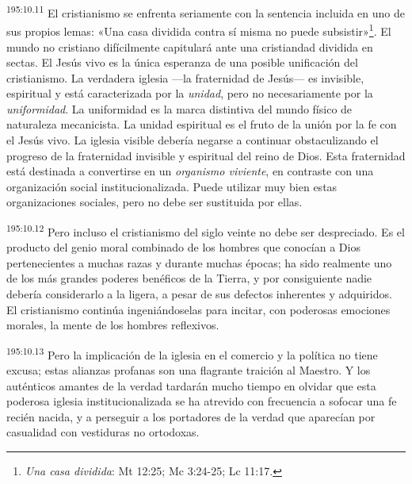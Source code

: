 \par
\textsuperscript{195:10.11} El cristianismo se enfrenta seriamente con la sentencia incluida en uno de sus propios lemas: «Una casa dividida contra sí misma no puede subsistir»\footnote{\textit{Una casa dividida}: Mt 12:25; Mc 3:24-25; Lc 11:17.}. El mundo no cristiano difícilmente capitulará ante una cristiandad dividida en sectas. El Jesús vivo es la única esperanza de una posible unificación del cristianismo. La verdadera iglesia ---la fraternidad de Jesús--- es invisible, espiritual y está caracterizada por la \textit{unidad}, pero no necesariamente por la \textit{uniformidad}. La uniformidad es la marca distintiva del mundo físico de naturaleza mecanicista. La unidad espiritual es el fruto de la unión por la fe con el Jesús vivo. La iglesia visible debería negarse a continuar obstaculizando el progreso de la fraternidad invisible y espiritual del reino de Dios. Esta fraternidad está destinada a convertirse en un \textit{organismo viviente}, en contraste con una organización social institucionalizada. Puede utilizar muy bien estas organizaciones sociales, pero no debe ser sustituida por ellas.

\par
\textsuperscript{195:10.12} Pero incluso el cristianismo del siglo veinte no debe ser despreciado. Es el producto del genio moral combinado de los hombres que conocían a Dios pertenecientes a muchas razas y durante muchas épocas; ha sido realmente uno de los más grandes poderes benéficos de la Tierra, y por consiguiente nadie debería considerarlo a la ligera, a pesar de sus defectos inherentes y adquiridos. El cristianismo continúa ingeniándoselas para incitar, con poderosas emociones morales, la mente de los hombres reflexivos.

\par
\textsuperscript{195:10.13} Pero la implicación de la iglesia en el comercio y la política no tiene excusa; estas alianzas profanas son una flagrante traición al Maestro. Y los auténticos amantes de la verdad tardarán mucho tiempo en olvidar que esta poderosa iglesia institucionalizada se ha atrevido con frecuencia a sofocar una fe recién nacida, y a perseguir a los portadores de la verdad que aparecían por casualidad con vestiduras no ortodoxas.

